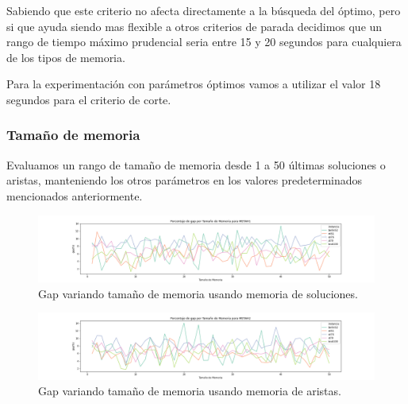\documentclass[10pt,a4paper]{article}
\begin{document}
Sabiendo que este criterio no afecta directamente a la búsqueda del óptimo, pero si que ayuda siendo mas flexible a otros criterios de parada decidimos que un rango de tiempo máximo prudencial seria entre 15 y 20 segundos para cualquiera de los tipos de memoria.

Para la experimentación con parámetros óptimos vamos a utilizar el valor 18 segundos para el criterio de corte.

\subsubsection{Tamaño de memoria}
Evaluamos un rango de tamaño de memoria desde 1 a 50 últimas soluciones o aristas, manteniendo los otros parámetros en los valores predeterminados mencionados anteriormente.

\begin{figure}[h!]
    \centering
    \includegraphics[scale=0.3]{Graphs-metaH/memsize-gap-METAH1.png}
    \caption{Gap variando tamaño de memoria usando memoria de soluciones.}
    \label{fig:exp_memsize_gap_metah1}
\end{figure}

\begin{figure}[h!]
    \centering
    \includegraphics[scale=0.3]{Graphs-metaH/memsize-gap-METAH2.png}
    \caption{Gap variando tamaño de memoria usando memoria de aristas.}
    \label{fig:exp_memsize_gap_metah2}
\end{figure}
\end{document}
